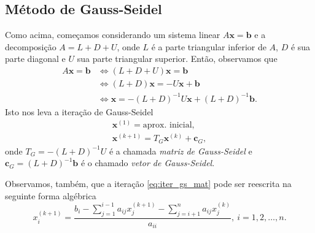 \subsection{Método de Gauss-Seidel}

Como acima, começamos considerando um sistema linear $A\pmb{x} = \pmb{b}$ e a decomposição $A = L + D + U$, onde $L$ é a parte triangular inferior de $A$, $D$ é sua parte diagonal e $U$ sua parte triangular superior. Então, observamos que
\begin{align}
  A\pmb{x} = \pmb{b} &\Leftrightarrow (L + D + U)\pmb{x} = \pmb{b}\\
  &\Leftrightarrow (L+D)\pmb{x} = -U\pmb{x} + \pmb{b}\\
  &\Leftrightarrow \pmb{x} = -(L+D)^{-1}U\pmb{x} + (L+D)^{-1}\pmb{b}.
\end{align}
Isto nos leva a iteração de Gauss-Seidel
\begin{align}
  \pmb{x}^{(1)} = \text{aprox. inicial},\\
  \pmb{x}^{(k+1)} = T_G\pmb{x}^{(k)} + \pmb{c}_G,\label{eq:iter_gs_mat}
\end{align}
onde $T_G = -(L+D)^{-1}U$ é a chamada \emph{matriz de Gauss-Seidel} e $\pmb{c}_G = (L+D)^{-1}\pmb{b}$ é o chamado \emph{vetor de Gauss-Seidel}.

Observamos, também, que a iteração \eqref{eq:iter_gs_mat} pode ser reescrita na seguinte forma algébrica
\begin{equation}
  x_i^{(k+1)} = \frac{{\displaystyle b_i - \sum_{j=1}^{i-1} a_{ij}x_j^{(k+1)} - \sum_{j=i+1}^{n} a_{ij}x_j^{(k)}}}{a_{ii}},~i=1, 2, \dotsc, n.
\end{equation}

